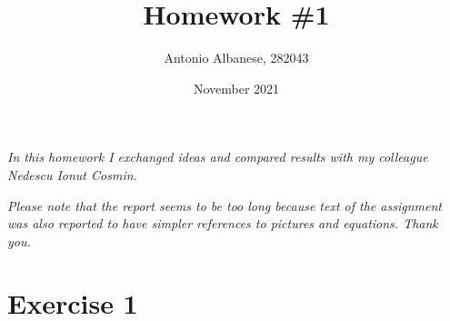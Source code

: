 \documentclass[
	12pt, %
]{fphw}
\title{Homework \#1} %
\author{Antonio Albanese, 282043} %
\date{November 2021} %
\institute{Politecnico di Torino} %
\begin{document}
\maketitle %

\emph{In this homework I exchanged ideas and compared results with my colleague Nedescu Ionut Cosmin.}

\vspace{10pt}

\emph{Please note that the report seems to be too long because text of the assignment was also reported to have simpler references to pictures and equations. Thank you.}
\section*{Exercise 1}
\end{document}
